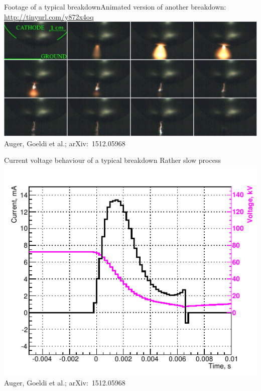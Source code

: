 \documentclass[]{beamer}
\newcommand*{\emphcol}{blue}
\begin{document}
\begin{frame}{Footage of a typical breakdown}{Animated version of another breakdown: \url{http://tinyurl.com/y872x4oq}}
	\centering
	\includegraphics[width=\textwidth]{hv/montage}\\
	{\tiny Auger, Goeldi et al.; arXiv:~1512.05968~\cite{breakdown_16}}
\end{frame}

\begin{frame}{Current voltage behaviour of a typical breakdown}{\color{\emphcol} Rather slow process}
	\centering
	\includegraphics[height=.75\textheight]{hv/IVcorr}\\
	{\tiny Auger, Goeldi et al.; arXiv:~1512.05968~\cite{breakdown_16}}
\end{frame}
\end{document}
